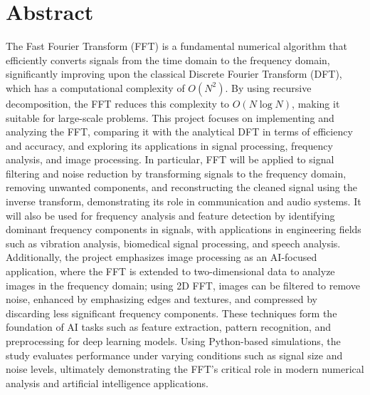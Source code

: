 \documentclass{zc-ust-hw}
\begin{document}
\maketitle
\tableofcontents
\pagebreak
\section{Abstract}
The Fast Fourier Transform (FFT) is a fundamental numerical algorithm that efficiently converts signals from the time domain to the frequency domain, significantly improving upon the classical Discrete Fourier Transform (DFT), which has a computational complexity of \(O(N^2)\). By using recursive decomposition, the FFT reduces this complexity to \(O(N \log N)\), making it suitable for large-scale problems. This project focuses on implementing and analyzing the FFT, comparing it with the analytical DFT in terms of efficiency and accuracy, and exploring its applications in signal processing, frequency analysis, and image processing. In particular, FFT will be applied to signal filtering and noise reduction by transforming signals to the frequency domain, removing unwanted components, and reconstructing the cleaned signal using the inverse transform, demonstrating its role in communication and audio systems. It will also be used for frequency analysis and feature detection by identifying dominant frequency components in signals, with applications in engineering fields such as vibration analysis, biomedical signal processing, and speech analysis. Additionally, the project emphasizes image processing as an AI-focused application, where the FFT is extended to two-dimensional data to analyze images in the frequency domain; using 2D FFT, images can be filtered to remove noise, enhanced by emphasizing edges and textures, and compressed by discarding less significant frequency components. These techniques form the foundation of AI tasks such as feature extraction, pattern recognition, and preprocessing for deep learning models. Using Python-based simulations, the study evaluates performance under varying conditions such as signal size and noise levels, ultimately demonstrating the FFT's critical role in modern numerical analysis and artificial intelligence applications.


\section*{}

\end{document}
